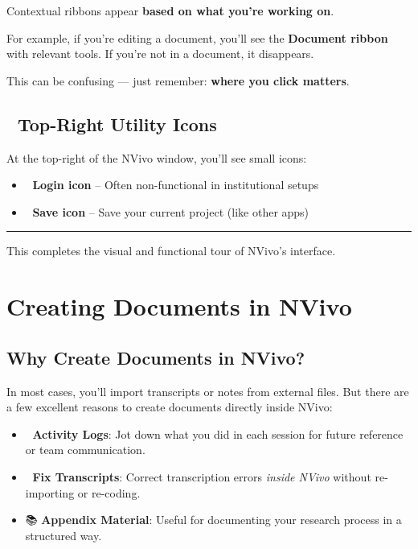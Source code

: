 \documentclass[
  letterpaper,
  DIV=11,
  numbers=noendperiod]{scrreprt}
\providecommand{\tightlist}{%
  \setlength{\itemsep}{0pt}\setlength{\parskip}{0pt}}\usepackage{longtable,booktabs,array}
\begin{document}
Contextual ribbons appear \textbf{based on what you're working on}.

For example, if you're editing a document, you'll see the
\textbf{Document ribbon} with relevant tools. If you're not in a
document, it disappears.

This can be confusing --- just remember: \textbf{where you click
matters}.

\section{🔧 Top-Right Utility Icons}\label{top-right-utility-icons}

At the top-right of the NVivo window, you'll see small icons:

\begin{itemize}
\tightlist
\item
  👤 \textbf{Login icon} -- Often non-functional in institutional setups
\item
  💾 \textbf{Save icon} -- Save your current project (like other apps)
\end{itemize}

\begin{center}\rule{0.5\linewidth}{0.5pt}\end{center}

This completes the visual and functional tour of NVivo's interface.

\chapter{Creating Documents in NVivo}\label{creating-documents-in-nvivo}

\section{Why Create Documents in
NVivo?}\label{why-create-documents-in-nvivo}

In most cases, you'll import transcripts or notes from external files.
But there are a few excellent reasons to create documents directly
inside NVivo:

\begin{itemize}
\tightlist
\item
  📝 \textbf{Activity Logs}: Jot down what you did in each session for
  future reference or team communication.
\item
  🔧 \textbf{Fix Transcripts}: Correct transcription errors \emph{inside
  NVivo} without re-importing or re-coding.
\item
  📚 \textbf{Appendix Material}: Useful for documenting your research
  process in a structured way.
\end{itemize}
\end{document}
